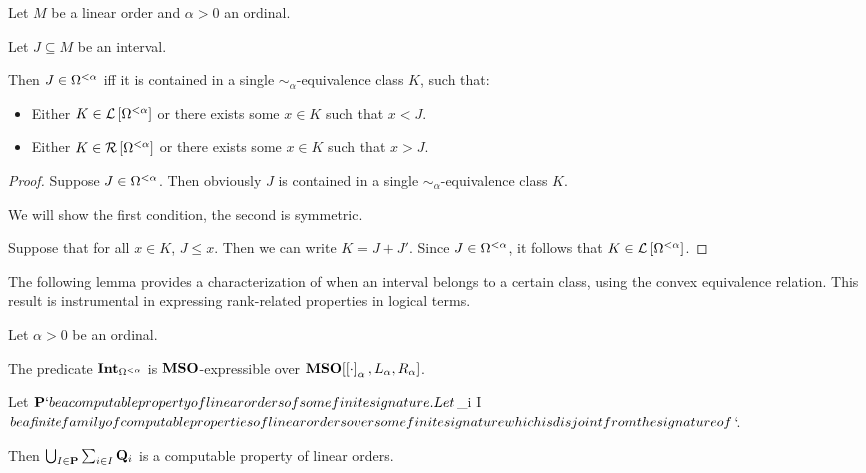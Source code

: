\begin{lemma}\label{alpha-expressible}
  Let $M$ be a linear order and $\alpha > 0$ an ordinal.

  Let $J \subseteq M$ be an interval.

  Then $J \in \Omega^{< \alpha}$ iff
  it is contained in a single $\sim_{\alpha}$-equivalence class $K$, such that:
  \begin{itemize}
    \item Either $K \in \mathcal{L} \left[ {{\Omega^{< \alpha}}} \right]$ or
          there exists some $x \in K$ such that $x < J$.
    \item Either $K \in \mathcal{R} \left[ {{\Omega^{< \alpha}}} \right]$ or
          there exists some $x \in K$ such that $x > J$.
  \end{itemize}
\end{lemma}

\begin{proof}
  Suppose $J \in \Omega^{< \alpha}$.
  Then obviously $J$ is contained in a single $\sim_{\alpha}$-equivalence class $K$.

  We will show the first condition, the second is symmetric.

  Suppose that for all $x \in K$, $J \le x$.
  Then we can write $K = J + J'$.
  Since $J \in \Omega^{< \alpha}$, it follows that $K \in \mathcal{L} \left[ {{\Omega^{< \alpha}}} \right]$.
\end{proof}

The following lemma provides a characterization of when an interval belongs to a certain class, using the convex
equivalence relation. This result is instrumental in expressing rank-related properties in logical terms.

\begin{corollary}\label{int-expressible}
  Let $\alpha > 0$ be an ordinal.

  The predicate $\mathbf{Int}_{\Omega^{< \alpha}}$ is $\mathbf{MSO}$-expressible over
  $\mathbf{MSO}[\left[ {\cdot} \right]_{\alpha}, L_{\alpha}, R_{\alpha}]$.
\end{corollary}

\begin{theorem}\label{computable-sum}
  Let $\pp` be a computable property of linear orders of some finite signature.

  Let $_{i \in I}$ be a \emph{finite} family of computable properties of linear orders
  over some finite signature which is disjoint from the signature of $\pp`.

  Then $\bigcup_{I \in \mathbf{P}} \sum_{i \in I} \mathbf{Q}_{i}$ is a computable property of linear orders.
\end{theorem}

